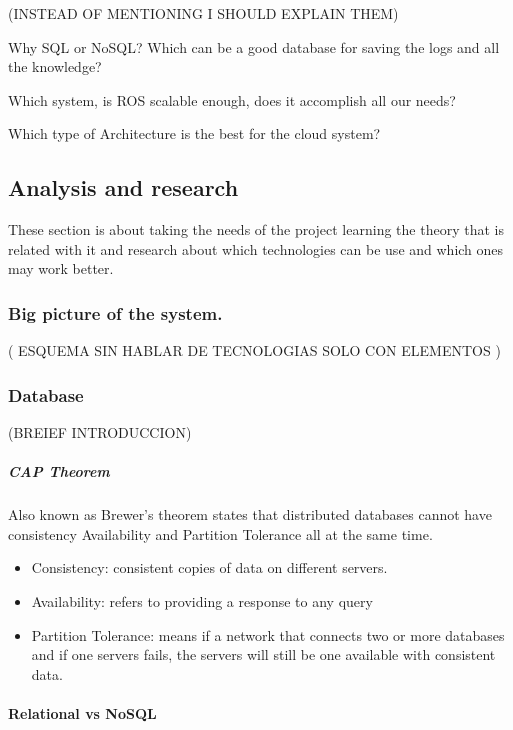 \documentclass[]{article}
\let\oldparagraph\paragraph
\renewcommand{\paragraph}[1]{\oldparagraph{#1}\mbox{}}
\let\oldsubparagraph\subparagraph
\renewcommand{\subparagraph}[1]{\oldsubparagraph{#1}\mbox{}}
\begin{document}
(INSTEAD OF MENTIONING I SHOULD EXPLAIN THEM)

Why SQL or NoSQL? Which can be a good database for saving the logs and
all the knowledge?

Which system, is ROS scalable enough, does it accomplish all our needs?

Which type of Architecture is the best for the cloud system?

\hypertarget{analysis-and-research}{%
\subsection{Analysis and research}\label{analysis-and-research}}

These section is about taking the needs of the project learning the
theory that is related with it and research about which technologies can
be use and which ones may work better.

\hypertarget{big-picture-of-the-system.}{%
\subsubsection{Big picture of the
system.}\label{big-picture-of-the-system.}}

( ESQUEMA SIN HABLAR DE TECNOLOGIAS SOLO CON ELEMENTOS )

\hypertarget{database}{%
\subsubsection{Database}\label{database}}

(BREIEF INTRODUCCION)

\hypertarget{cap-theorem}{%
\subparagraph{CAP Theorem}\label{cap-theorem}}

Also known as Brewer's theorem states that distributed databases cannot
have consistency Availability and Partition Tolerance all at the same
time.

\begin{itemize}
\item
  Consistency: consistent copies of data on different servers.
\item
  Availability: refers to providing a response to any query
\item
  Partition Tolerance: means if a network that connects two or more
  databases and if one servers fails, the servers will still be one
  available with consistent data.
\end{itemize}

\hypertarget{relational-vs-nosql}{%
\paragraph{Relational vs NoSQL}\label{relational-vs-nosql}}
\end{document}
